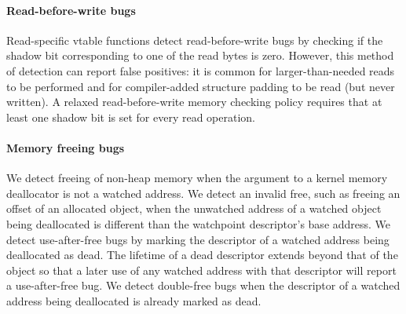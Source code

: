 \documentclass[letterpaper,twocolumn,10pt]{article}
\begin{document}
\paragraph{Read-before-write bugs}
Read-specific vtable functions detect read-before-write bugs by checking if the shadow bit corresponding to one of the read bytes is zero. However, this method of detection can report false positives: it is common for larger-than-needed reads to be performed and for compiler-added structure padding to be read (but never written). A relaxed read-before-write memory checking policy requires that at least one shadow bit is set for every read operation.

\paragraph{Memory freeing bugs}
We detect freeing of non-heap memory when the argument to a kernel memory deallocator is not a watched address. We detect an invalid free, such as freeing an offset of an allocated object, when the unwatched address of a watched object being deallocated is different than the watchpoint descriptor's base address. We detect use-after-free bugs by marking the descriptor of a watched address being deallocated as dead. The lifetime of a dead descriptor extends beyond that of the object so that a later use of any watched address with that descriptor will report a use-after-free bug. We detect double-free bugs when the descriptor of a watched address being deallocated is already marked as dead.





\end{document}
